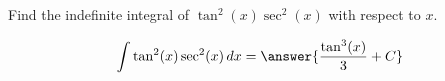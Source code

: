 \documentclass{ximera}
\author{Gregory Hartman \and Matthew Carr}
\begin{document}
\begin{exercise}

Find the indefinite integral of $ \tan ^2(x) \sec ^2(x)$ with respect to $x$.

\[
\int \tan ^2(x) \sec ^2(x)\d x=\answer{\frac{\tan ^3(x)}{3}+C}
\]

\end{exercise}
\end{document}
